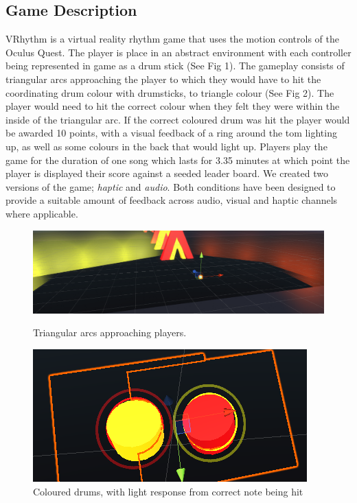 \documentclass[manuscript,screen]{acmart}
\begin{document}
\subsection{Game Description}
VRhythm is a virtual reality rhythm game that uses the motion controls of the Oculus Quest. The player is place in an abstract environment with each controller being represented in game as a drum stick (See Fig 1). The gameplay consists of triangular arcs approaching the player to which they would have to hit the coordinating drum colour with drumsticks, to triangle colour (See Fig 2). The player would need to hit the correct colour when they felt they were within the inside of the triangular arc. If the correct coloured drum was hit the player would be awarded 10 points, with a visual feedback of a ring around the tom lighting up, as well as some colours in the back that would light up. Players play the game for the duration of one song which lasts for 3.35 minutes at which point the player is displayed their score against a seeded leader board. We created two versions of the game; \textit{haptic} and \textit{audio}. Both conditions have been designed to provide a suitable amount of feedback across audio, visual and haptic channels where applicable. 

\begin{figure}[h]
  \centering
  
  \includegraphics[width=\linewidth]{samples/image13.png}
  \caption{Triangular arcs approaching players.}
  
  \includegraphics[width=\linewidth]{samples/image9.png}
  \caption{Coloured drums, with light response from correct note being hit}
\end{figure}
\end{document}
